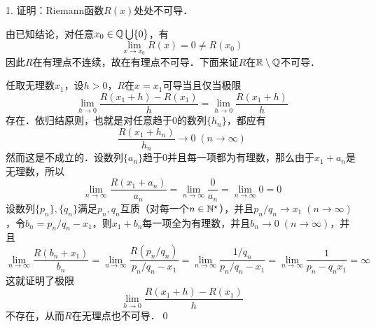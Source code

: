 \question

1. 证明：Riemann函数$R(x)$处处不可导．

\prove 由已知结论，对任意$x_0 \in \mathbb{Q} \bigcup \{ 0 \}$，有
\begin{equation}
    \lim_{x \to x_0} R(x) = 0 \neq R(x_0)
\end{equation}
因此$R$在有理点不连续，故在有理点不可导．下面来证$R$在$\mathbb{R\setminus Q}$不可导．

任取无理数$x_1$，设$h > 0$，$R$在$x=x_1$可导当且仅当极限
\begin{equation}
    \lim_{h \to 0} \frac{R(x_1+h)-R(x_1)}{h} = \lim_{h \to 0} \frac{R(x_1+h)}{h}
\end{equation}
存在．依归结原则，也就是对任意趋于$0$的数列$\{ h_n \}$，都应有
\begin{equation}
    \frac{R(x_1+h_n)}{h_n} \to 0 \; (n \to \infty)
\end{equation}
然而这是不成立的．设数列$\{ a_n \}$趋于$0$并且每一项都为有理数，那么由于$x_1 + a_n$是无理数，所以
\begin{equation}
    \lim_{n \to \infty} \frac{R(x_1 + a_n)}{a_n} = \lim_{n \to \infty} \frac{0}{a_n} = \lim_{n \to \infty} 0 = 0
\end{equation}
设数列$\{ p_n \}, \{ q_n \}$满足$p_n, q_n$互质（对每一个$n \in \mathbb{N}^\star$），并且$p_n/q_n \to x_1 \; (n \to \infty)$，令$b_n = p_n/q_n - x_1$，则$x_1 + b_n$每一项全为有理数，并且$b_n \to 0 \; (n \to \infty)$，并且
\begin{equation}
    \lim_{n \to \infty} \frac{R(b_n + x_1)}{b_n} = \lim_{n \to \infty} \frac{R(p_n/q_n)}{p_n/q_n-x_1} = \lim_{n \to \infty} \frac{1/q_n}{p_n/q_n-x_1} = \lim_{n \to \infty} \frac{1}{p_n - q_n x_1} = \infty
\end{equation}
这就证明了极限
\begin{equation}
    \lim_{h \to 0} \frac{R(x_1+h)-R(x_1)}{h}
\end{equation}
不存在，从而$R$在无理点也不可导．\qed\bigskip
